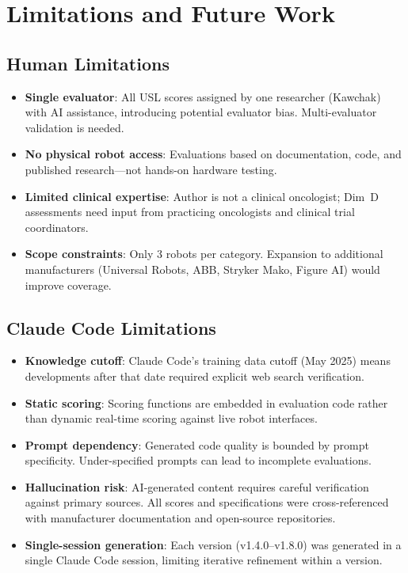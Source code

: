 \section{Limitations and Future Work}
\label{sec:limitations}

\subsection{Human Limitations}
\begin{itemize}
  \item \textbf{Single evaluator}: All USL scores assigned by one researcher (Kawchak) with AI assistance, introducing potential evaluator bias. Multi-evaluator validation is needed.
  \item \textbf{No physical robot access}: Evaluations based on documentation, code, and published research---not hands-on hardware testing.
  \item \textbf{Limited clinical expertise}: Author is not a clinical oncologist; Dim~D assessments need input from practicing oncologists and clinical trial coordinators.
  \item \textbf{Scope constraints}: Only 3 robots per category. Expansion to additional manufacturers (Universal Robots, ABB, Stryker Mako, Figure AI) would improve coverage.
\end{itemize}

\subsection{Claude Code Limitations}
\begin{itemize}
  \item \textbf{Knowledge cutoff}: Claude Code's training data cutoff (May 2025) means developments after that date required explicit web search verification.
  \item \textbf{Static scoring}: Scoring functions are embedded in evaluation code rather than dynamic real-time scoring against live robot interfaces.
  \item \textbf{Prompt dependency}: Generated code quality is bounded by prompt specificity. Under-specified prompts can lead to incomplete evaluations.
  \item \textbf{Hallucination risk}: AI-generated content requires careful verification against primary sources. All scores and specifications were cross-referenced with manufacturer documentation and open-source repositories.
  \item \textbf{Single-session generation}: Each version (v1.4.0--v1.8.0) was generated in a single Claude Code session, limiting iterative refinement within a version.
\end{itemize}


